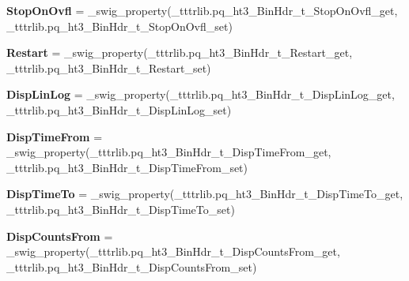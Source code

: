 \begin{DoxyCompactItemize}
\item 
\mbox{\label{classtttrlib_1_1pq__ht3___bin_hdr__t_afaaff968dbf974fb14ea73822fdb1971}} 
{\bfseries Stop\+On\+Ovfl} = \+\_\+swig\+\_\+property(\+\_\+tttrlib.\+pq\+\_\+ht3\+\_\+\+Bin\+Hdr\+\_\+t\+\_\+\+Stop\+On\+Ovfl\+\_\+get, \+\_\+tttrlib.\+pq\+\_\+ht3\+\_\+\+Bin\+Hdr\+\_\+t\+\_\+\+Stop\+On\+Ovfl\+\_\+set)
\item 
\mbox{\label{classtttrlib_1_1pq__ht3___bin_hdr__t_aae18b9b2baa506083d9ccc6df5b740ec}} 
{\bfseries Restart} = \+\_\+swig\+\_\+property(\+\_\+tttrlib.\+pq\+\_\+ht3\+\_\+\+Bin\+Hdr\+\_\+t\+\_\+\+Restart\+\_\+get, \+\_\+tttrlib.\+pq\+\_\+ht3\+\_\+\+Bin\+Hdr\+\_\+t\+\_\+\+Restart\+\_\+set)
\item 
\mbox{\label{classtttrlib_1_1pq__ht3___bin_hdr__t_ac3859c5d04b829b03148f710dc8d421d}} 
{\bfseries Disp\+Lin\+Log} = \+\_\+swig\+\_\+property(\+\_\+tttrlib.\+pq\+\_\+ht3\+\_\+\+Bin\+Hdr\+\_\+t\+\_\+\+Disp\+Lin\+Log\+\_\+get, \+\_\+tttrlib.\+pq\+\_\+ht3\+\_\+\+Bin\+Hdr\+\_\+t\+\_\+\+Disp\+Lin\+Log\+\_\+set)
\item 
\mbox{\label{classtttrlib_1_1pq__ht3___bin_hdr__t_aba6348dbb032bbb5d2d9b8227d55cf8c}} 
{\bfseries Disp\+Time\+From} = \+\_\+swig\+\_\+property(\+\_\+tttrlib.\+pq\+\_\+ht3\+\_\+\+Bin\+Hdr\+\_\+t\+\_\+\+Disp\+Time\+From\+\_\+get, \+\_\+tttrlib.\+pq\+\_\+ht3\+\_\+\+Bin\+Hdr\+\_\+t\+\_\+\+Disp\+Time\+From\+\_\+set)
\item 
\mbox{\label{classtttrlib_1_1pq__ht3___bin_hdr__t_aab670f3bd318a40d4f5000c0bc9b4c14}} 
{\bfseries Disp\+Time\+To} = \+\_\+swig\+\_\+property(\+\_\+tttrlib.\+pq\+\_\+ht3\+\_\+\+Bin\+Hdr\+\_\+t\+\_\+\+Disp\+Time\+To\+\_\+get, \+\_\+tttrlib.\+pq\+\_\+ht3\+\_\+\+Bin\+Hdr\+\_\+t\+\_\+\+Disp\+Time\+To\+\_\+set)
\item 
\mbox{\label{classtttrlib_1_1pq__ht3___bin_hdr__t_af0f3570a3e8b83d2197a6b16f4dc4003}} 
{\bfseries Disp\+Counts\+From} = \+\_\+swig\+\_\+property(\+\_\+tttrlib.\+pq\+\_\+ht3\+\_\+\+Bin\+Hdr\+\_\+t\+\_\+\+Disp\+Counts\+From\+\_\+get, \+\_\+tttrlib.\+pq\+\_\+ht3\+\_\+\+Bin\+Hdr\+\_\+t\+\_\+\+Disp\+Counts\+From\+\_\+set)

\end{DoxyCompactItemize}
